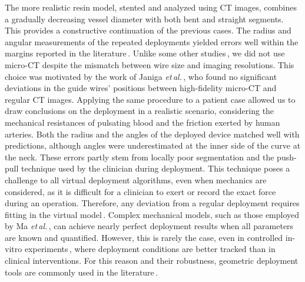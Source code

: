 The more realistic resin model, stented and analyzed using CT images, combines a gradually decreasing vessel diameter with both bent and straight segments. This provides a constructive continuation of the previous cases. The radius and angular measurements of the repeated deployments yielded errors well within the margins reported in the literature\,\cite{Zavodszky2020, Janiga2013, Larrabide2012, Bouillot2016}. Unlike some other studies\,\cite{Janiga2013, Bouillot2016, Larrabide2012}, we did not use micro-CT despite the mismatch between wire size and imaging resolutions. This choice was motivated by the work of Janiga \textit{et\,al.}\,\cite{Janiga2013}, who found no significant deviations in the guide wires' positions between high-fidelity micro-CT and regular CT images. Applying the same procedure to a patient case allowed us to draw conclusions on the deployment in a realistic scenario, considering the mechanical resistances of pulsating blood and the friction exerted by human arteries. Both the radius and the angles of the deployed device matched well with predictions, although angles were underestimated at the inner side of the curve at the neck. These errors partly stem from locally poor segmentation and the push-pull technique used by the clinician during deployment. This technique poses a challenge to all virtual deployment algorithms, even when mechanics are considered, as it is difficult for a clinician to exert or record the exact force during an operation. Therefore, any deviation from a regular deployment requires fitting in the virtual model\,\cite{Janiga2013}. Complex mechanical models, such as those employed by Ma \textit{et\,al.}\,\cite{Ma2012}, can achieve nearly perfect deployment results when all parameters are known and quantified. However, this is rarely the case, even in controlled in-vitro experiments\,\cite{Zavodszky2020, Larrabide2012}, where deployment conditions are better tracked than in clinical interventions. For this reason and their robustness, geometric deployment tools are commonly used in the literature\,\cite{Janiga2013, Berg2017, Sindeev2018}.

